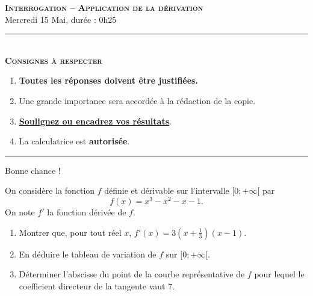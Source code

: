 \documentclass[11pt]{article}
\begin{document}
%
%


\begin{center}
\textbf{\LARGE \textsc{Interrogation -- Application de la dérivation}}\\[2mm]

{\large Mercredi 15 Mai, durée : 0h25}\\[1mm]
\noindent\rule{8cm}{0.4pt}\\[1mm]
\textbf{\textsc{Consignes à respecter}}
\begin{enumerate}[label=\textbf{\arabic*/}]
\item \textbf{Toutes les réponses doivent être justifiées.}
\item Une grande importance sera accordée à la rédaction de la
  copie.
\item \underline{\textbf{Soulignez ou encadrez vos résultats}}.
\item La calculatrice est \textbf{autorisée}.
    \end{enumerate}
\noindent\rule{12cm}{0.4pt}
\end{center}

\begin{center}
  Bonne chance !
\end{center}

\begin{exo}[$6$ points]
  On considère la fonction $f$ définie et dérivable sur l'intervalle $[0;
    +\infty[$ par
  \[
    f(x) = x^3 - x^2 - x - 1.
  \]
  On note $f'$ la fonction dérivée de $f$.
  \begin{enumerate}
    \item Montrer que, pour tout réel $x$, $f'(x)=3\left( x+\frac{1}{3}
      \right)(x-1)$.
    \item En déduire le tableau de variation de $f$ sur $[0; +\infty[$.
      \item Déterminer l'abscisse du point de la courbe représentative de $f$
        pour lequel le coefficient directeur de la tangente vaut $7$.
  \end{enumerate}
\end{exo}
\end{document}
